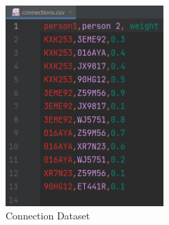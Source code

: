 \documentclass[fontsize=11pt]{article}
\begin{document}
    \begin{figure}[h]
        \centering
        \includegraphics[width=60mm,scale=0.3]{pictures/connections_dataset.png}
        \caption{Connection Dataset}
    \end{figure}


    \newpage
\end{document}
